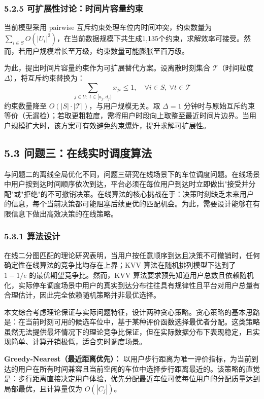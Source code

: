 \documentclass{ctexart}
\begin{document}
\subsubsection*{5.2.5 可扩展性讨论：时间片容量约束}

当前模型采用 pairwise 互斥约束处理车位内时间冲突，约束数量为 $\sum_{i\in S} O(|U_i|^2)$，在当前数据规模下共生成1,135个约束，求解效率可接受。然而，若用户规模增长至万级，约束数量可能膨胀至百万级。

为此，提出时间片容量约束作为可扩展替代方案。设离散时刻集合 $\mathcal{T}$（时间粒度 $\Delta$），将互斥约束替换为：
\begin{equation}
  \sum_{j \in U:\; t \in [a_j, d_j)} x_{ji} \leq 1,\quad \forall i\in S,\ \forall t\in\mathcal{T} \label{eq:timeslot}
\end{equation}
约束数量降至 $O(|S|\cdot|\mathcal{T}|)$，与用户规模无关。取 $\Delta=1$ 分钟时与原始互斥约束等价（无漏检）；若取更粗粒度，需将用户时段向上取整至最近时间片边界。当用户规模扩大时，该方案可有效避免约束爆炸，提升求解可扩展性。

\subsection*{5.3 问题三：在线实时调度算法}

与问题二的离线全局优化不同，问题三研究在线场景下的车位调度问题。在线场景中用户按到达时间顺序依次到达，平台必须在每位用户到达时立即做出"接受并分配"或"拒绝"的不可撤销决策。在线算法的核心挑战在于：决策时刻缺乏未来用户的信息，每个当前决策都可能阻塞后续更优的匹配机会。为此，需要设计能够在有限信息下做出高效决策的在线策略。

\subsubsection*{5.3.1 算法设计}

在线二分图匹配的理论研究表明，当用户按任意顺序到达且决策不可撤销时，任何确定性在线算法的竞争比均存在上界；KVV 算法在随机排列模型下达到了 $1-1/e$ 的最优期望竞争比。然而，KVV 算法要求预先知道用户总数且依赖随机化，实际停车调度场景中用户的真实到达分布往往具有规律性且平台对用户总量有合理估计，因此完全依赖随机策略并非最优选择。

本文综合考虑理论保证与实际问题特征，设计两种贪心策略。贪心策略的基本思路是：在当前时刻可用的候选车位中，基于某种评价函数选择最优者分配。这类策略虽然无法提供最坏情况下的理论竞争比保证，但在实际数据分布下表现稳定，且实现简单、计算开销极低，适合实时调度场景。

\textbf{Greedy-Nearest（最近距离优先）：} 以用户步行距离为唯一评价指标，为当前到达的用户在所有时间兼容且当前空闲的车位中选择步行距离最近的。该策略的直觉是：步行距离直接决定用户体验，优先分配最近车位可使每位用户的分配质量达到局部最优，且计算量仅为 $O(|C_j|)$。
\end{document}
